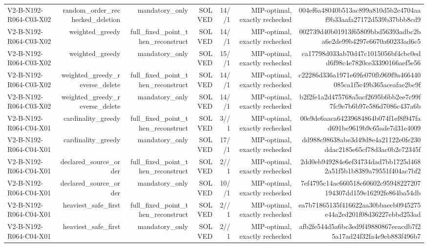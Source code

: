 {\begin{longtable}{lrrrrrr}
V2-B-N192-R064-C03-X02 & random\_order\_rechecked\_deletion & mandatory\_only & SOLVED & 14//1 & MIP-optimal, exactly rechecked & 004ef6a48040b513ac899a810d5b2e4704aaf9b33aafa27172d539b37bbb8cd9 \\
V2-B-N192-R064-C03-X02 & weighted\_greedy & full\_fixed\_point\_then\_reconstruct & SOLVED & 14//1 & MIP-optimal, exactly rechecked & 002739d40b01913f65809bbd56393adbc2ba6e2de99b4297e6670a60233ad6c5 \\
V2-B-N192-R064-C03-X02 & weighted\_greedy & mandatory\_only & SOLVED & 15//1 & MIP-optimal, exactly rechecked & ca17798d033ab70d47c1015056bf4cbc0edd6f98c4e7820ce33390166aef5e56 \\
V2-B-N192-R064-C03-X02 & weighted\_greedy\_reverse\_delete & full\_fixed\_point\_then\_reconstruct & SOLVED & 14//1 & MIP-optimal, exactly rechecked & c22286d336a1971e69fe070fb969f9a466440085ca1f5c49b365aceafae2bc9f \\
V2-B-N192-R064-C03-X02 & weighted\_greedy\_reverse\_delete & mandatory\_only & SOLVED & 14//1 & MIP-optimal, exactly rechecked & b2f2fe1a2d475768a5acf2695b6bb2ee7c99f7fc9e7b6b97e586d7086c437a6b \\
V2-B-N192-R064-C04-X01 & cardinality\_greedy & full\_fixed\_point\_then\_reconstruct & SOLVED & 3//1 & MIP-optimal, exactly rechecked & 00e9de6aaca64239684864b074f1ef8f947fad691be9619b9c65ade7d31e4009 \\
V2-B-N192-R064-C04-X01 & cardinality\_greedy & mandatory\_only & SOLVED & 17//1 & MIP-optimal, exactly rechecked & dd988c98638abe3d49d8e4a21122e0fe230ddac2185e65cf78d3ac0b2e72345f \\
V2-B-N192-R064-C04-X01 & declared\_source\_order & full\_fixed\_point\_then\_reconstruct & SOLVED & 2//1 & MIP-optimal, exactly rechecked & 2dd0eb949284e6ef34734dad7bb1725d4682a51f5b1b8389a79551f404ac7bf2 \\
V2-B-N192-R064-C04-X01 & declared\_source\_order & mandatory\_only & SOLVED & 10//1 & MIP-optimal, exactly rechecked & 7ef4795c14ac660518c60602c95948227207194307dd159e16292fe864ba54db \\
V2-B-N192-R064-C04-X01 & heaviest\_safe\_first & full\_fixed\_point\_then\_reconstruct & SOLVED & 2//1 & MIP-optimal, exactly rechecked & ea7b71865135f416622aa30bbaecb0945275e44a2ed201f08d36227ebbd253ad \\
V2-B-N192-R064-C04-X01 & heaviest\_safe\_first & mandatory\_only & SOLVED & 2//1 & MIP-optimal, exactly rechecked & afb2fe544d5a6bc3ed9f49880867eeacdb7f25a17ad24f32fa4e9eb883f496b7 \\

\end{longtable}}
